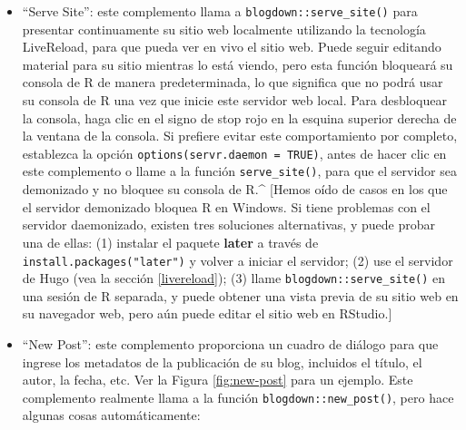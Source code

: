 \documentclass[12pt,]{krantz}
\theoremstyle{definition}
\theoremstyle{definition}
\theoremstyle{definition}
\theoremstyle{remark}
\begin{document}
\begin{itemize}
\item
  ``Serve Site'': este complemento llama a
  \texttt{blogdown::serve\_site()} para presentar continuamente su sitio
  web localmente utilizando la tecnología LiveReload, para que pueda ver
  en vivo el sitio web. Puede seguir editando material para su sitio
  mientras lo está viendo, pero esta función bloqueará su consola de R
  de manera predeterminada, lo que significa que no podrá usar su
  consola de R una vez que inicie este servidor web local. Para
  desbloquear la consola, haga clic en el signo de stop rojo en la
  esquina superior derecha de la ventana de la consola. Si prefiere
  evitar este comportamiento por completo, establezca la opción
  \texttt{options(servr.daemon\ =\ TRUE)}, antes de hacer clic en este
  complemento o llame a la función \texttt{serve\_site()}, para que el
  servidor sea demonizado y no bloquee su consola de R.\^{} {[}Hemos
  oído de casos en los que el servidor demonizado bloquea R en Windows.
  Si tiene problemas con el servidor daemonizado, existen tres
  soluciones alternativas, y puede probar una de ellas: (1) instalar el
  paquete \textbf{later} a través de \texttt{install.packages("later")}
  y volver a iniciar el servidor; (2) use el servidor de Hugo (vea la
  sección \ref{livereload}); (3) llame \texttt{blogdown::serve\_site()}
  en una sesión de R separada, y puede obtener una vista previa de su
  sitio web en su navegador web, pero aún puede editar el sitio web en
  RStudio.{]}
\item
  ``New Post'': este complemento proporciona un cuadro de diálogo para
  que ingrese los metadatos de la publicación de su blog, incluidos el
  título, el autor, la fecha, etc. Ver la Figura \ref{fig:new-post} para
  un ejemplo. Este complemento realmente llama a la función
  \texttt{blogdown::new\_post()}, pero hace algunas cosas
  automáticamente:


\end{itemize}
\end{document}
